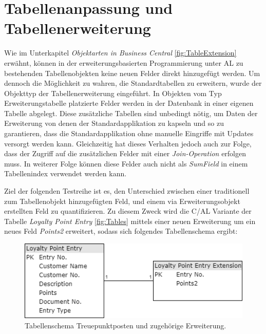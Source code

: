 \section{Tabellenanpassung und Tabellenerweiterung}
Wie im Unterkapitel \textit{Objektarten in Business Central} \ref{fig:TableExtension} erwähnt, können in der erweiterungsbasierten Programmierung unter AL zu bestehenden Tabellenobjekten keine neuen Felder direkt hinzugefügt werden. Um  dennoch die Möglichkeit zu wahren, die Standardtabellen zu erweitern, wurde der Objekttyp der Tabellenerweiterung eingeführt. In Objekten vom Typ Erweiterungstabelle platzierte Felder werden in der Datenbank in einer eigenen Tabelle abgelegt. Diese zusätzliche Tabellen sind unbedingt nötig, um Daten der Erweiterung von denen der Standardapplikation zu kapseln und so zu garantieren, dass die Standardapplikation ohne manuelle Eingriffe mit Updates versorgt werden kann. Gleichzeitig hat dieses Verhalten jedoch auch zur Folge, dass der Zugriff auf die zusätzlichen Felder mit einer \textit{Join-Operation} erfolgen muss. In weiterer Folge können diese Felder auch nicht als \textit{SumField} in einem Tabellenindex verwendet werden kann. 

Ziel der folgenden Testreihe ist es, den Unterschied zwischen einer traditionell zum Tabellenobjekt hinzugefügten Feld, und einem via Erweiterungsobjekt erstellten Feld zu quantifizieren. Zu diesem Zweck wird die C/AL Variante der Tabelle \textit{Loyalty Point Entry} \ref{fig:Tables} mittels einer neuen Erweiterung um ein neues Feld \textit{Points2} erweitert, sodass sich folgendes Tabellenschema ergibt:

\begin{figure}[H]
	\centering
	\includegraphics[width=115mm]{images/Test2}
	\caption{Tabellenschema Treuepunktposten und zugehörige Erweiterung.}
	\label{fig:Test2Schema}
\end{figure}

